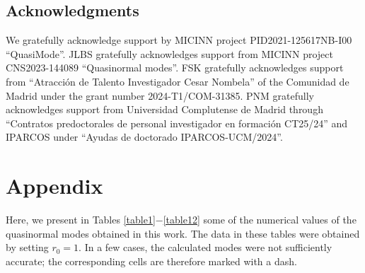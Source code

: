 \documentclass[11pt,a4paper]{article}
\begin{document}


\subsection*{Acknowledgments}

We gratefully acknowledge support by MICINN project PID2021-125617NB-I00 ``QuasiMode''.
JLBS gratefully acknowledges support from MICINN project CNS2023-144089 ``Quasinormal modes''.
FSK gratefully acknowledges support from ``Atracci\'on de Talento Investigador Cesar Nombela'' of the Comunidad de Madrid under the grant number 2024-T1/COM-31385.
PNM gratefully acknowledges support from Universidad Complutense de Madrid through ``Contratos predoctorales de personal investigador en formación CT25/24'' and IPARCOS under ``Ayudas de doctorado IPARCOS-UCM/2024''.








\section*{Appendix}


Here, we present in Tables 
\ref{table1}$-$\ref{table12} some of the numerical values of the quasinormal modes obtained in this work. The data in these tables were obtained by setting
$r_0=1$. 
In a few cases, the calculated modes were not sufficiently accurate;
the corresponding cells are therefore marked with a dash.

\end{document}
